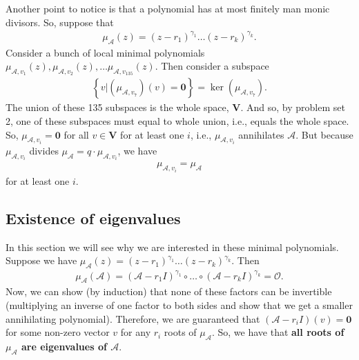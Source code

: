 \documentclass{article}
\theoremstyle{definition}
\newcommand{\V}{\mathbf{V}}
\newcommand{\A}{\mathcal{A}}
\begin{document}
Another point to notice is that a polynomial has at most finitely man monic divisors. So, suppose that
\begin{align*}
\mu_\A(z) = (z- r_1)^{\gamma_1}\dots (z - r_k)^{\gamma_k}.
\end{align*}
Consider a bunch of local minimal polynomials $\mu_{\A,v_1}(z), \mu_{\A,v_2}(z), \dots \mu_{\A,v_135}(z) $. Then consider a subspace
\begin{align*}
\left\{
v \bigg\vert (\mu_{\A,v_7})(v) = \mathbf{0}
\right\} = \ker\left( \mu_{\A,v_7} \right).
\end{align*}
The union of these 135 subspaces is the whole space, $\V$. And so, by problem set 2, one of these subspaces must equal to whole union, i.e., equals the whole space. So, $\mu_{\A,v_i} = \mathbf{0}$ for all $v\in \V$ for at least one $i$, i.e., $\mu_{\A, v_i}$ annihilates $\A$. But because $\mu_{\A,v_i}$ divides $\mu_{\A} = q\cdot \mu_{\A,v_i}$, we have
\begin{align*}
\mu_{\A,v_i} = \mu_{\A}
\end{align*} 
for at least one $i$. 





\subsection{Existence of eigenvalues}

In this section we will see why we are interested in these minimal polynomials. Suppose we have $\mu_\A(z) = (z- r_1)^{\gamma_1}\dots (z - r_k)^{\gamma_k}$. Then
\begin{align*}
\mu_\A(\A) = (\A- r_1 I)^{\gamma_1}\circ \dots \circ (\A - r_k I)^{\gamma_k} = \mathcal{O}.
\end{align*}
Now, we can show (by induction) that none of these factors can be invertible (multiplying an inverse of one factor to both sides and show that we get a smaller annihilating polynomial). Therefore, we are guaranteed that $(\A - r_i I)(v) = \mathbf{0}$ for some non-zero vector $v$ for any $r_i$ roots of $\mu_{\A}$. So, we have that \textbf{all roots of $\mu_\A$ are eigenvalues of $\A$}. \\
\end{document}
